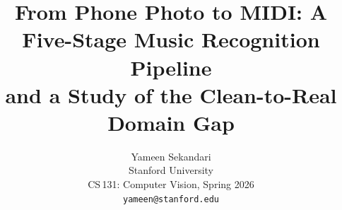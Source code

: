 \documentclass[10pt,twocolumn,letterpaper]{article}
\title{From Phone Photo to MIDI: A Five-Stage Music Recognition Pipeline\\
and a Study of the Clean-to-Real Domain Gap}
\author{Yameen Sekandari\\
Stanford University\\
CS\,131: Computer Vision, Spring 2026\\
{\tt\small yameen@stanford.edu}
}
\begin{document}
\maketitle








{
    \small
    
    
}
\end{document}
